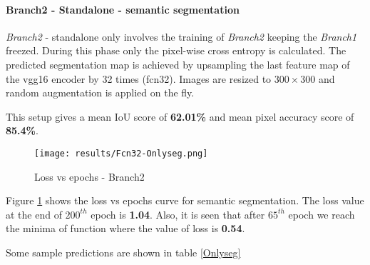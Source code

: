 \paragraph{Branch2 - Standalone - semantic segmentation}

\textit{Branch2} - standalone only involves the training of \textit{Branch2} keeping the \textit{Branch1} freezed. During this phase only the pixel-wise cross entropy is calculated. The predicted segmentation map is achieved by upsampling the last feature map of the \ac{vgg}16 encoder by 32 times (\ac{fcn}32). Images are resized to $300 \times 300$ and random augmentation is applied on the fly.

\par

This setup gives a mean IoU score of \textbf{62.01\%} and mean pixel accuracy score of \textbf{85.4\%}.

\clearpage

\begin{figure}[h!]
    \centering
    \texttt{[image: results/Fcn32-Onlyseg.png]}
    \caption{Loss vs epochs - Branch2}
    \label{onlysegcurve}
\end{figure}

Figure \ref{onlysegcurve} shows the loss vs epochs curve for semantic segmentation. The loss value at the end of $200^{th}$ epoch is \textbf{1.04}. Also, it is seen that after $65^{th}$ epoch we reach the minima of function where the value of loss is \textbf{0.54}.

Some sample predictions are shown in table 
\ref{Onlyseg}

